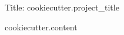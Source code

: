\documentclass{article}
\begin{document}
Title: {{ cookiecutter.project_title }}

{{ cookiecutter.content }}

\end{document}
